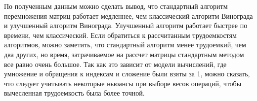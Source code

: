 \begin{figure}[ht!]
\end{figure}


По полученным данным можно сделать вывод, что стандартный алгоритм перемножения матриц работает медленнее, чем классический алгоритм Винограда и улучшенный алгоритм Винограда. Улучшенный алгоритм работает быстрее по времени, чем классический. Если обратиться к рассчитанным трудоемкостям алгоритмов, можно заметить, что стандартный алгоритм менее трудоемкий, чем два других, но время, затрачиваемое на рассчет матрицы стандартным методом все равно очень большое. Так как это зависит от модели вычислений, где умножение и обращения к индексам и сложение были взяты за 1, можно сказать, что следует учитывать некоторые ньюансы при выборе весов операций, чтобы вычесленная трудоемкость была более точной.
